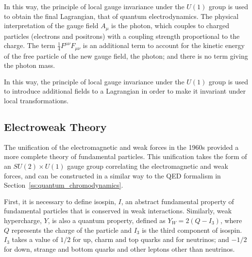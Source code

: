 In this way, the principle of local gauge invariance under the $U(1)$ group is used to obtain the final
Lagrangian, that of quantum electrodynamics. The physical interpretation of the gauge field $A_{\mu}$ is the
photon, which couples to charged particles (electrons and positrons) with a coupling strength proportional to
the charge. The term $\frac{1}{4}F^{\mu\nu}F_{\mu\nu}$ is an additional term to account for the kinetic energy
of the free particle of the new gauge field, \ie the photon; and there is no term giving the photon mass.


In this way, the principle of local gauge invariance under the $U(1)$ group is used to introduce additional
fields to a Lagrangian in order to make it invariant under local transformations.

\subsection{Electroweak Theory}
\label{ss:electroweak_theory}

The unification of the electromagnetic and weak forces in the 1960s provided a more complete theory of
fundamental particles. This unification takes the form of an $SU(2) \times U(1)$ gauge group correlating the
electromagnetic and weak forces, and can be constructed in a similar way to the QED formalism in
Section~\ref{ss:quantum_chromodynamics}. 

First, it is necessary to define isospin, $I$, an abstract fundamental property of fundamental particles that
is conserved in weak interactions. Similarly, weak hypercharge, $Y$, is also a quantum property, defined as
$Y_{W} = 2(Q-I_{3})$, where $Q$ represents the charge of the particle and $I_{3}$ is the third component of
isospin. $I_{3}$ takes a value of $1/2$ for up, charm and top quarks and for neutrinos; and
$-1/2$ for down, strange and bottom quarks and other leptons other than neutrinos.

